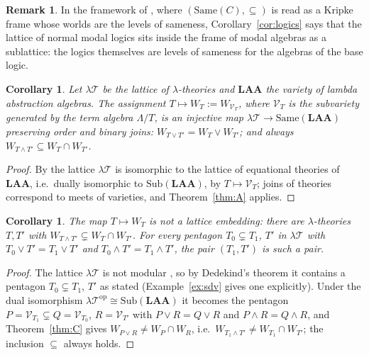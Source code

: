 \documentclass[11pt]{amsart}
\newtheorem{cor}[thm]{Corollary}
\theoremstyle{definition}
\newtheorem{rem}[thm]{Remark}
\newcommand{\Same}{\mathrm{Same}}
\newcommand{\Sub}{\mathrm{Sub}}
\newcommand{\sV}{\mathcal V}
\newcommand{\lT}{\lambda\mathcal T}
\begin{document}
\begin{rem}
In the framework of \cite{Levelshift}, where $(\Same(C),\subseteq)$ is read as
a Kripke frame whose worlds are the levels of sameness, Corollary~\ref{cor:logics}
says that the lattice of normal modal logics sits inside the frame of modal
algebras as a sublattice: the logics themselves are levels of sameness for the
algebras of the base logic.
\end{rem}

\begin{cor}\label{cor:lambda}
Let $\lT$ be the lattice of $\lambda$-theories and $\mathbf{LAA}$ the variety of
lambda abstraction algebras. The assignment $T\mapsto W_T:=W_{\sV_T}$, where
$\sV_T$ is the subvariety generated by the term algebra $\Lambda/T$, is an
injective map $\lT\to\Same(\mathbf{LAA})$ preserving order and binary joins:
$W_{T\vee T'}=W_T\vee W_{T'}$; and always $W_{T\wedge T'}\subseteq W_T\cap W_{T'}$.
\end{cor}
\begin{proof}
By \cite{Salibra00} the lattice $\lT$ is isomorphic to the lattice of
equational theories of $\mathbf{LAA}$, i.e.\ dually isomorphic to
$\Sub(\mathbf{LAA})$, by $T\mapsto\sV_T$; joins of theories correspond to meets
of varieties, and Theorem~\ref{thm:A} applies.
\end{proof}

\begin{cor}\label{cor:lambdano}
The map $T\mapsto W_T$ is not a lattice embedding: there are
$\lambda$-theories $T,T'$ with $W_{T\wedge T'}\subsetneq W_T\cap W_{T'}$. For
every pentagon $T_0\subsetneq T_1$, $T'$ in $\lT$ with $T_0\vee T'=T_1\vee T'$
and $T_0\wedge T'=T_1\wedge T'$, the pair $(T_1,T')$ is such a pair.
\end{cor}
\begin{proof}
The lattice $\lT$ is not modular \cite{Salibra01}, so by Dedekind's theorem it
contains a pentagon $T_0\subsetneq T_1$, $T'$ as stated (Example~\ref{ex:sdv}
gives one explicitly). Under the dual
isomorphism $\lT^{\mathrm{op}}\cong\Sub(\mathbf{LAA})$ it becomes the pentagon
$P=\sV_{T_1}\subsetneq Q=\sV_{T_0}$, $R=\sV_{T'}$ with $P\vee R=Q\vee R$ and
$P\wedge R=Q\wedge R$, and Theorem~\ref{thm:C} gives
$W_{P\vee R}\ne W_P\cap W_R$, i.e.\ $W_{T_1\wedge T'}\ne W_{T_1}\cap W_{T'}$;
the inclusion $\subseteq$ always holds.
\end{proof}
\end{document}
